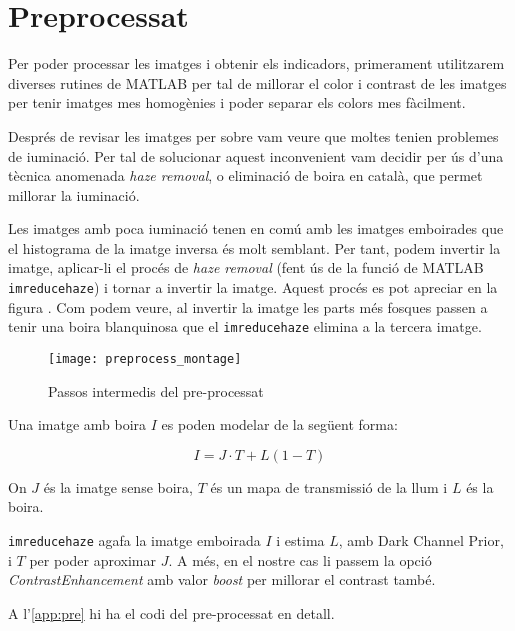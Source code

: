 
%




\section{Preprocessat}

Per poder processar les imatges i obtenir els indicadors, primerament utilitzarem
diverses rutines de MATLAB per tal de millorar el color i contrast de les imatges per tenir
imatges mes homogènies i poder separar els colors mes fàcilment.

Després de revisar les imatges per sobre vam veure que moltes tenien problemes de
i\lgem uminació. Per tal de solucionar aquest inconvenient vam decidir per ús d'una
tècnica anomenada \emph{haze removal}, o eliminació de boira en català, que permet
millorar la i\lgem uminació.

Les imatges amb poca i\lgem uminació tenen en comú amb les imatges emboirades que el
histograma de la imatge inversa és molt semblant. Per tant, podem invertir la imatge,
aplicar-li el procés de \emph{haze removal} (fent ús de la funció de MATLAB 
\texttt{imreducehaze}) i tornar a invertir la imatge.  Aquest procés es pot
apreciar en la figura \cite{fig:preprocess_montage}. Com podem veure, al invertir la
imatge les parts més fosques passen a tenir una boira blanquinosa que el
\texttt{imreducehaze} elimina a la tercera imatge.

\begin{figure}[H]
\centering
\texttt{[image: preprocess\_montage]}
\caption{Passos intermedis del pre-processat}%
\label{fig:preprocess_montage}
\end{figure}

Una imatge amb boira $I$ es poden modelar de la següent forma:

$$I = J \cdot T + L(1-T)$$

On $J$ és la imatge sense boira, $T$ és un mapa de transmissió de la llum i
$L$ és la boira.

\texttt{imreducehaze} agafa la imatge emboirada $I$ i estima $L$, amb Dark Channel Prior,
i $T$ per poder
aproximar $J$. A més, en el nostre cas li passem la opció \emph{ContrastEnhancement}
amb valor \emph{boost} per millorar el contrast també.

A l'\cref{app:pre} hi ha el codi del pre-processat en detall.
